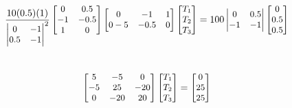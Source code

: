 \documentclass[10pt]{article}
\begin{document}
\begin{enumerate}
\begin{align*}
\small{
\frac{10(0.5)(1)}
{\begin{vmatrix}
0 & -1 \\
0.5 & -1
\end{vmatrix}^2} 
\begin{bmatrix}
0 & 0.5\\
 -1 & -0.5 \\
 1 & 0
\end{bmatrix} 
\begin{bmatrix}
0 & -1 & 1 \\
0-5 & -0.5 & 0
\end{bmatrix} 
\begin{bmatrix}
T_1 \\ T_2 \\ T_3
\end{bmatrix} = 100 
\begin{vmatrix} 0 & 0.5 \\ 
-1 & -1 \end{vmatrix} 
\begin{bmatrix} 
0 \\ 0.5 \\ 0.5
\end{bmatrix}}
\end{align*}\\
\begin{align*}
\small{
\begin{bmatrix}
5 & -5 & 0\\
-5 & 25 & -20 \\
0 & -20 & 20
\end{bmatrix}
\begin{bmatrix} 
T_1 \\ T_2 \\ T_3
\end{bmatrix} =  
\begin{bmatrix} 
0 \\ 25 \\ 25
\end{bmatrix}}
\end{align*}
\end{enumerate}
\end{document}
